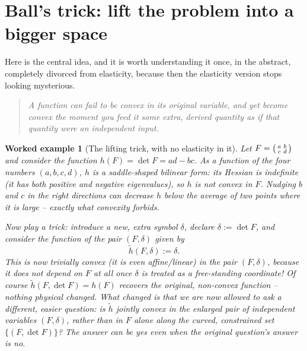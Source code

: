 \documentclass[11pt,a4paper]{article}
\newtheorem{worked}{Worked example}
\newenvironment{takeaway}
 {\begin{quote}\small\itshape\color{blue!60!black}}
 {\end{quote}}
\begin{document}
\section{Ball's trick: lift the problem into a bigger space}
\label{sec:lifting-trick}

Here is the central idea, and it is worth understanding it once, in
the abstract, completely divorced from elasticity, because then the
elasticity version stops looking mysterious.

\begin{takeaway}
A function can fail to be convex in its \emph{original} variable, and
yet become convex the moment you feed it some \emph{extra, derived}
quantity as if that quantity were an independent input.
\end{takeaway}

\begin{worked}[The lifting trick, with no elasticity in it]
\label{ex:lifting}
Let $F=\begin{psmallmatrix}a&b\\c&d\end{psmallmatrix}$ and consider the
function $h(F)=\det F=ad-bc$. As a function of the four numbers
$(a,b,c,d)$, $h$ is a saddle-shaped bilinear form: its Hessian is
indefinite (it has both positive and negative eigenvalues), so $h$ is
\emph{not} convex in $F$. Nudging $b$ and $c$ in the right directions
can decrease $h$ below the average of two points where it is large --
exactly what convexity forbids.

Now play a trick: introduce a new, extra symbol $\delta$, declare
$\delta:=\det F$, and consider the function of the \emph{pair}
$(F,\delta)$ given by
\[
 \tilde h(F,\delta) := \delta.
\]
This is now trivially convex (it is even affine/linear) in the pair
$(F,\delta)$, because it does not depend on $F$ at all once $\delta$ is
treated as a free-standing coordinate! Of course $\tilde h(F,\det F) =
h(F)$ recovers the original, non-convex function -- nothing physical
changed. What changed is that we are now allowed to ask a
\emph{different, easier} question: is $\tilde h$ jointly convex in the
enlarged pair of independent variables $(F,\delta)$, rather than in $F$
alone along the curved, constrained set $\{(F,\det F)\}$? The answer
can be yes even when the original question's answer is no.
\end{worked}
\end{document}
